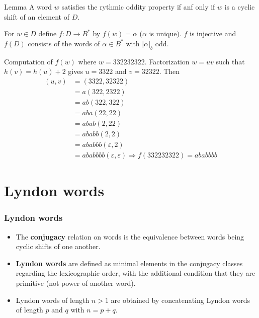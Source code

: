 \documentclass{beamer}
\theoremstyle{definition}
\begin{document}
\begin{frame}
\begin{alertblock}{Lemma}
A word $w$ satisfies the rythmic oddity property if anf only if $w$ is a cyclic shift of an element of $D$. 
\end{alertblock}\pause

For $w\in D$ define $f:D\to B^*$ by $f(w)=\alpha$ ($\alpha$ is unique). $f$ is injective and $f(D)$ consists of the words of $\alpha\in B^*$ with $|\alpha|_b$ odd. 
\end{frame}







\begin{frame}
\begin{example}
Computation of $f(w)$ where $w=332232322$. Factorization $w=uv$ such that $h(v)=h(u)+2$ gives $u=3322$ and $v=32322$. Then 
\begin{align*}
(u, v) &= (3322, 32322)\\
&= a(322, 2322)\\
&= ab(322, 322)\\
&= aba(22, 22)\\
&= abab(2, 22)\\
&= ababb(2, 2)\\
&= ababbb(\varepsilon, 2)\\
&= ababbbb(\varepsilon, \varepsilon)\Rightarrow f(332232322)=ababbbb
\end{align*}
\end{example}
\end{frame}
\section{Lyndon words}
\begin{frame}
\frametitle{Lyndon words}
\begin{itemize}
\item The \textbf{conjugacy} relation on words is the equivalence
between words being cyclic shifts of one another.
\item<2-> \textbf{Lyndon words} are defined as
minimal elements in the conjugacy classes regarding
the lexicographic order, with the additional condition
that they are primitive (not power of another word).
\item<3-> Lyndon words of length $n>1$ are
obtained by concatenating Lyndon words of length $p$
and $q$ with $n = p+q$.

\end{itemize}

\end{frame}
\end{document}
